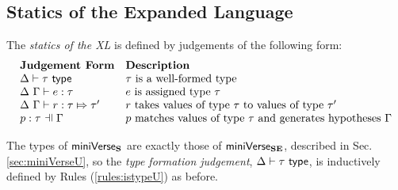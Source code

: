 {{{{\subsection{Statics of the Expanded Language}\label{sec:inner-core-statics-UP}
The \emph{statics of the XL} is defined by judgements of the following form:
\[\begin{array}{ll}
\textbf{Judgement Form} & \textbf{Description}\\
\istypeU{\Delta}{\tau} & \text{$\tau$ is a well-formed type}\\
\hastypeU{\Delta}{\Gamma}{e}{\tau} & \text{$e$ is assigned type $\tau$}\\
\ruleType{\Delta}{\Gamma}{r}{\tau}{\tau'} & \text{$r$ takes values of type $\tau$ to values of type $\tau'$}\\
\patType{\pctx}{p}{\tau} & \text{$p$ matches values of type $\tau$ and generates hypotheses $\pctx$} 
\end{array}\]

The types of $\mathsf{miniVerse}_\textbf{S}$ are exactly those of $\mathsf{miniVerse}_\textbf{SE}$, described in Sec. \ref{sec:miniVerseU}, so the \emph{type formation judgement}, $\Delta \vdash \tau~\mathsf{type}$, is inductively defined by Rules (\ref{rules:istypeU}) as before.

}}}}
